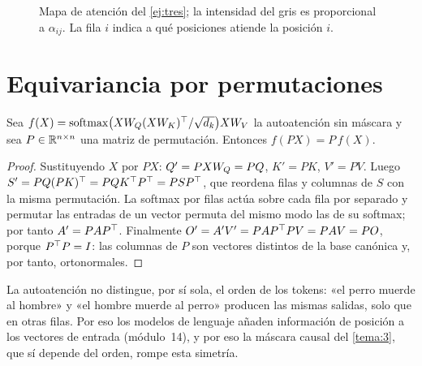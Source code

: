 \begin{figure}[h]
\centering
{}
\caption{Mapa de atención del \cref{ej:tres}; la intensidad del gris es proporcional a $\alpha_{ij}$. La fila $i$ indica a qué posiciones atiende la posición $i$.}
\label{fig:mapa}
\end{figure}

\section{Equivariancia por permutaciones}

\begin{proposicion}[Equivariancia]\label{prop:equivariancia}
Sea $f(X)=\operatorname{softmax}\bigl(XW_{Q}(XW_{K})^{\top}/\sqrt{d_k}\bigr)XW_{V}$ la autoatención sin máscara y sea $P\in\mathbb{R}^{n\times n}$ una matriz de permutación. Entonces $f(PX)=P\,f(X)$.
\end{proposicion}

\begin{proof}
Sustituyendo $X$ por $PX$: $Q'=PXW_{Q}=PQ$, $K'=PK$, $V'=PV$. Luego $S'=PQ(PK)^{\top}=PQK^{\top} P^{\top}=PSP^{\top}$, que reordena filas y columnas de $S$ con la misma permutación. La softmax por filas actúa sobre cada fila por separado y permutar las entradas de un vector permuta del mismo modo las de su softmax; por tanto $A'=PAP^{\top}$. Finalmente $O'=A'V'=PAP^{\top} PV=PAV=PO$, porque $P^{\top} P=I$: las columnas de $P$ son vectores distintos de la base canónica y, por tanto, ortonormales.
\end{proof}

La autoatención no distingue, por sí sola, el orden de los tokens: «el perro muerde al hombre» y «el hombre muerde al perro» producen las mismas salidas, solo que en otras filas. Por eso los modelos de lenguaje añaden información de posición a los vectores de entrada (módulo~14), y por eso la máscara causal del \cref{tema:3}, que sí depende del orden, rompe esta simetría.

